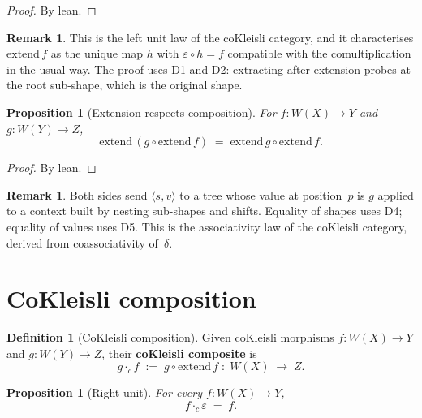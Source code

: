 \documentclass[11pt,a4paper]{article}
\theoremstyle{plain}
\newtheorem{proposition}[theorem]{Proposition}
\theoremstyle{definition}
\newtheorem{definition}[theorem]{Definition}
\newtheorem{remark}[theorem]{Remark}
\begin{document}
\begin{proof}
By lean.
\end{proof}

\begin{remark}
This is the left unit law of the coKleisli category, and it characterises
$\mathrm{extend}\,f$ as the unique map $h$ with $\varepsilon \circ h = f$
compatible with the comultiplication in the usual way. The proof uses D1 and
D2: extracting after extension probes at the root sub-shape, which is the
original shape.
\end{remark}

\begin{proposition}[Extension respects composition]\label{prop:extend-extend}
For $f : W(X) \to Y$ and $g : W(Y) \to Z$,
\begin{equation}
  \mathrm{extend}\,(g \circ \mathrm{extend}\,f)
  \;=\;
  \mathrm{extend}\,g \circ \mathrm{extend}\,f.
\end{equation}
\end{proposition}

\begin{proof}
By lean.
\end{proof}

\begin{remark}
Both sides send $\langle s, v\rangle$ to a tree whose value at position~$p$ is
$g$ applied to a context built by nesting sub-shapes and shifts. Equality of
shapes uses D4; equality of values uses D5. This is the associativity law of
the coKleisli category, derived from coassociativity of~$\delta$.
\end{remark}

\section{CoKleisli composition}

\begin{definition}[CoKleisli composition]\label{def:cokleisli-comp}
Given coKleisli morphisms $f : W(X) \to Y$ and $g : W(Y) \to Z$, their
\textbf{coKleisli composite} is
\begin{equation}
  g \mathbin{\cdot_c} f \;:=\; g \circ \mathrm{extend}\,f
  \;:\; W(X) \;\longrightarrow\; Z.
\end{equation}
\end{definition}

\begin{proposition}[Right unit]\label{prop:cokleisli-right-unit}
For every $f : W(X) \to Y$,
\begin{equation}
  f \mathbin{\cdot_c} \varepsilon \;=\; f.
\end{equation}
\end{proposition}
\end{document}
